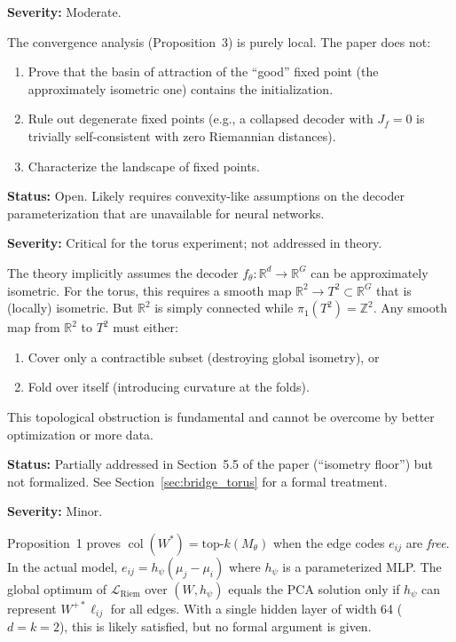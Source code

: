 \documentclass{article}
\DeclareMathOperator{\col}{col}
\begin{document}
\begin{gapbox}
\textbf{Severity:} Moderate.

The convergence analysis (Proposition~3) is purely local. The paper does not:
\begin{enumerate}
  \item Prove that the basin of attraction of the ``good'' fixed point
    (the approximately isometric one) contains the initialization.
  \item Rule out degenerate fixed points (e.g., a collapsed decoder with
    $J_f = 0$ is trivially self-consistent with zero Riemannian distances).
  \item Characterize the landscape of fixed points.
\end{enumerate}

\textbf{Status:} Open. Likely requires convexity-like assumptions on the
decoder parameterization that are unavailable for neural networks.
\end{gapbox}

\begin{gapbox}
\textbf{Severity:} Critical for the torus experiment; not addressed in theory.

The theory implicitly assumes the decoder $f_\theta: \mathbb{R}^d \to \mathbb{R}^G$
can be approximately isometric. For the torus, this requires a smooth map
$\mathbb{R}^2 \to T^2 \subset \mathbb{R}^G$ that is (locally) isometric.
But $\mathbb{R}^2$ is simply connected while $\pi_1(T^2) = \mathbb{Z}^2$.
Any smooth map from $\mathbb{R}^2$ to $T^2$ must either:
\begin{enumerate}
  \item Cover only a contractible subset (destroying global isometry), or
  \item Fold over itself (introducing curvature at the folds).
\end{enumerate}
This topological obstruction is fundamental and cannot be overcome by
better optimization or more data.

\textbf{Status:} Partially addressed in Section~5.5 of the paper
(``isometry floor'') but not formalized. See Section~\ref{sec:bridge_torus}
for a formal treatment.
\end{gapbox}

\begin{gapbox}
\textbf{Severity:} Minor.

Proposition~1 proves $\col(W^*) = \text{top-}k(M_\theta)$ when the edge
codes $e_{ij}$ are \textit{free}. In the actual model,
$e_{ij} = h_\psi(\mu_j - \mu_i)$ where $h_\psi$ is a parameterized MLP.
The global optimum of $\mathcal{L}_{\text{Riem}}$ over $(W, h_\psi)$ equals
the PCA solution only if $h_\psi$ can represent $W^{+*}\ell_{ij}$ for all
edges. With a single hidden layer of width 64 ($d = k = 2$), this is likely
satisfied, but no formal argument is given.
\end{gapbox}
\end{document}
